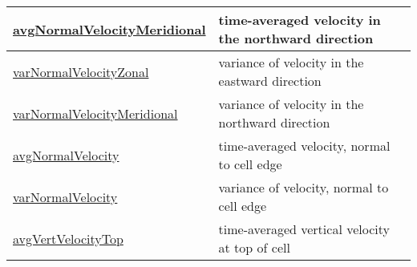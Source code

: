 {\begin{center}
\begin{longtable}{| p{2.0in} | p{4.0in} |}
	\hline
	\hyperref[subsec:var_sec_state_avgNormalVelocityMeridional]{avgNormalVelocityMeridional} & time-averaged velocity in the northward direction \\
	\hline
	\hyperref[subsec:var_sec_state_varNormalVelocityZonal]{varNormalVelocityZonal} & variance of velocity in the eastward direction \\
	\hline
	\hyperref[subsec:var_sec_state_varNormalVelocityMeridional]{varNormalVelocityMeridional} & variance of velocity in the northward direction \\
	\hline
	\hyperref[subsec:var_sec_state_avgNormalVelocity]{avgNormalVelocity} & time-averaged velocity, normal to cell edge \\
	\hline
	\hyperref[subsec:var_sec_state_varNormalVelocity]{varNormalVelocity} & variance of velocity, normal to cell edge \\
	\hline
	\hyperref[subsec:var_sec_state_avgVertVelocityTop]{avgVertVelocityTop} & time-averaged vertical velocity at top of cell \\
	\hline
\end{longtable}
\end{center}
}
